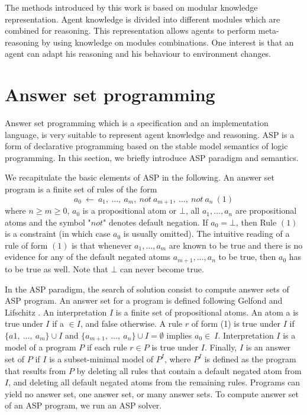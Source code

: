 \documentclass{aamas2012}
\begin{document}
	The methods introduced by this work is based on modular knowledge representation.
	Agent knowledge is divided into different modules which are combined for reasoning.
	This representation allows agents to perform meta-reasoning by using knowledge on modules combinations.
	One interest is that an agent can adapt his reasoning and his behaviour to environment changes.

\section{Answer set programming}

	Answer set programming which is a specification and an implementation language, is very suitable to represent agent knowledge and reasoning.
	ASP is a form of declarative programming based on the stable model semantics of logic programming.
	In this section, we briefly introduce ASP paradigm and semantics.

	We recapitulate the basic elements of ASP in the following.
	An answer set program is a finite set of rules of the form
	$$a_{0}\ \leftarrow\ a_{1},\ \ldots,\ a_{m},\ not\ a_{m+1},\ \ldots,\ not\ a_{n}\ (1)$$
	where $n \ge m \ge 0$, $a_{0}$ is a propositional atom or $\bot$, all
	$a_{1}, \ldots ,a_{n}$ are propositional atoms and the symbol "$not$" denotes default negation.
	If $a_{0} = \bot$, then Rule $(1)$ is a constraint (in which case $a_{0}$ is usually omitted).
	The intuitive reading of a rule of form $(1)$ is that whenever $a_{1}, \ldots, a_{m}$
	are known to be true and there is no evidence for any of the default negated atoms $a_{m+1}, \ldots, a_{n}$ to be true, then $a_{0}$ has to be true as well.
	Note that $\bot$ can never become true.

	In the ASP paradigm, the search of solution consist to compute answer sets of ASP program.
	An answer set for a program is defined following Gelfond and Lifschitz \cite{DBLP:conf/iclp/GelfondL88}.
	An interpretation $I$ is a finite set of propositional atoms.
	An atom a is true under $I$ if a $\in I$, and false otherwise.
	A rule $r$ of form (1) is true under $I$ if $\{a1,\ \dots,\ a_{m}\} \cup I$ and $\{a_{m+1},\ \ldots,\ a_{n}\} \cup I = \emptyset$ implies $a_{0} \in\ I$.
	Interpretation $I$ is a model of a program $P$ if each rule $r \in P$ is true under $I$.
	Finally, $I$ is an answer set of $P$ if $I$ is a subset-minimal model of $P^{I}$,
	where $P^{I}$ is defined as the program that results from $P$ by deleting all rules that contain a default negated atom from $I$, 
	and deleting all default negated atoms from the remaining rules.
	Programs can yield no answer set, one answer set, or many answer sets.
	To compute answer set of an ASP program, we run an ASP solver.
	
\end{document}
